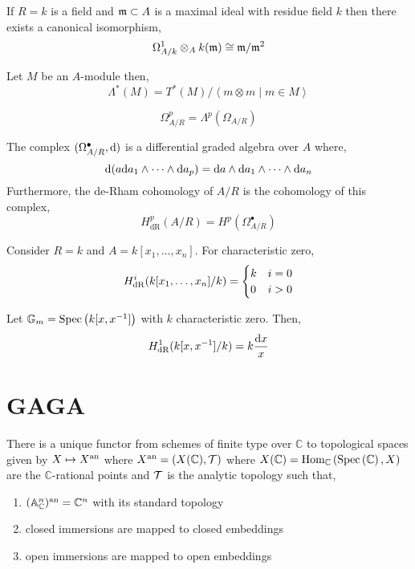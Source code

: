 \documentclass[12pt]{article}
\begin{document}
\begin{remark}
If $R = k$ is a field and $\mathfrak{m} \subset A$ is a maximal ideal with residue field $k$ then there exists a canonical isomorphism,
\[ \Omega^1_{A /k } \otimes_A k(\mathfrak{m}) \cong \mathfrak{m} / \mathfrak{m}^2 \]  
\end{remark}

\begin{definition}
Let $M$ be an $A$-module then,
\[ \Lambda^*(M) = T^*(M)/ \left< m \otimes m \mid m \in M \right> \]
\end{definition}

\begin{definition}
\[ \Omega^p_{A/R} = \Lambda^p (\Omega_{A / R}) \]
\end{definition}


\begin{theorem}
The complex $(\Omega^\bullet_{A / R}, \mathrm{d}{})$ is a differential graded algebra over $A$ where,
\[ \mathrm{d}{ (a \mathrm{d}{a_1} \wedge \cdots \wedge \mathrm{d}{a_p})} = \mathrm{d}{a} \wedge \mathrm{d}{a_1} \wedge \cdots \wedge \mathrm{d}{a_n} \]
Furthermore, the de-Rham cohomology of $A/R$ is the cohomology of this complex,
\[ H^p_{\text{dR}}(A/R) = H^p(\Omega^\bullet_{A/R}) \]
\end{theorem}

\begin{example}
Consider $R = k$ and $A = k[x_1, \dots, x_n]$. For characteristic zero,
\[ H^i_{\mathrm{dR}}(k[x_1, \dots, x_n] / k) = 
\begin{cases}
k & i = 0
\\
0 & i > 0
\end{cases} \] 
\end{example}


\begin{example}
Let $\mathbb{G}_m = \mathrm{Spec}\left( k[x, x^{-1}] \right)$ with $k$ characteristic zero. Then,
\[ H^1_{\mathrm{dR}}(k[x, x^{-1}] / k) = k \frac{\mathrm{d}{x}}{x} \]
\end{example}




\section{GAGA}

\renewcommand{\C}{\mathbb{C}}

\begin{theorem}
There is a unique functor from schemes of finite type over $\C$ to topological spaces given by $X \mapsto X^{\mathrm{an}}$ where $X^\an = (X(\C), \T)$ where $X(\C) = \Homover{\C}{\Spec{\C}}{X}$ are the $\C$-rational points and $\mathcal{T}$ is the analytic topology such that,
\begin{enumerate}
\item $(\A^n_\C)^\an = \C^n$ with its standard topology
\item closed immersions are mapped to closed embeddings
\item open immersions are mapped to open embeddings
\end{enumerate}
\end{theorem}
\end{document}
